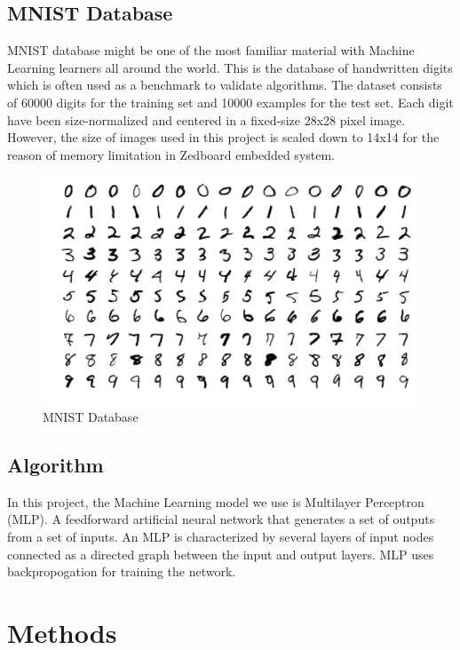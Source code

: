 \documentclass[12pt, a4paper, oneside]{article}
\begin{document}
    	\subsection{MNIST Database}
    		MNIST database might be one of the most familiar material with Machine Learning learners all around the world. This is the database of handwritten digits which is often used as a benchmark to validate algorithms. The dataset consists of 60000 digits for the training set and 10000 examples for the test set. Each digit have been size-normalized and centered in a fixed-size 28x28 pixel image. However, the size of images used in this project is scaled down to 14x14 for the reason of memory limitation in Zedboard embedded system. 
    		\begin{figure}[tbh!]
    			\begin{center}
    				\includegraphics[scale=0.25]{MNIST.png}
    				\caption{MNIST Database}
    				\label{fig:MNIST Database}
    			\end{center}
    		\end{figure}
    		
    	\subsection{Algorithm}
            In this project, the Machine Learning model we use is Multilayer Perceptron (MLP). A feedforward artificial neural network that generates a set of outputs from a set of inputs. An MLP is characterized by several layers of input nodes connected as a directed graph between the input and output layers. MLP uses backpropogation for training the network. 
    		
    \section{Methods}
\end{document}
